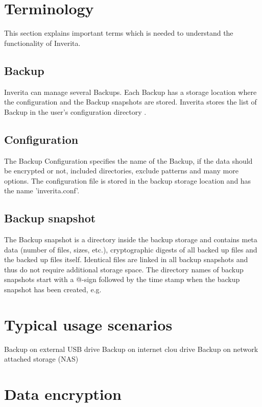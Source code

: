 \section{Terminology}

This section explains important terms which is needed to understand
the functionality of Inverita.

\subsection{Backup}
Inverita can manage several Backups. Each Backup has
a storage location where the configuration and the
Backup snapshots are stored.
Inverita stores the list of Backup in the user's
configuration directory .

\label{test1}

\subsection{Configuration}
The Backup Configuration specifies the name of the Backup,
if the data should be encrypted or not, included
directories, exclude patterns and many more options.
The configuration file is stored in the backup storage
location and has the name 'inverita.conf'.

\subsection{Backup snapshot}
The Backup snapshot is a directory inside the
backup storage and contains meta data (number of files, sizes, etc.),
cryptographic digests of all backed up files and the backed up files itself.
Identical files are linked in all backup snapshots and thus do not
require additional storage space.
The directory names of backup snapshots start with a @-sign followed by
the time stamp when the backup snapshot has been created, e.g. 

\section{Typical usage scenarios}
       Backup on external USB drive
       Backup on internet clou drive
       Backup on network attached storage (NAS)
\section{Data encryption}


